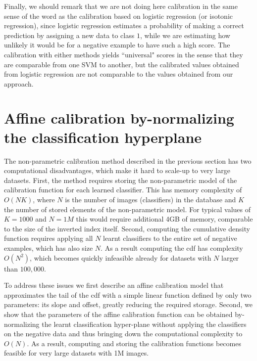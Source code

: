       Finally, we should remark that we are not doing here calibration in the same sense of the word as the calibration based on logistic regression (or isotonic regression), since logistic regression estimates a probability of making a correct prediction by assigning a new data to class $1$, while we are estimating how unlikely it would be for a negative example to have such a high score. The calibration with either methods yields ``universal" scores in the sense that they are comparable from one SVM to another, but the calibrated values obtained from logistic regression are not comparable to the values obtained from our approach.

\section{Affine calibration by-normalizing the classification hyperplane}
\label{sec:calibrationRenorm}
  
  The non-parametric calibration method described in the previous section has two computational disadvantages, which make it hard to scale-up to very large datasets. 
  First, the method requires storing the non-parametric model of the calibration function for each learned classifier. This has memory complexity 
  of $O(NK)$, where $N$ is the number of images (classifiers) in the database and $K$ the number of stored elements of the non-parametric model. For typical values of $K=1000$ and $N=1M$ this would require additional 4GB of memory, comparable to the size of the inverted index itself. Second, computing the cumulative density function requires applying all $N$ learnt classifiers to the entire set of negative examples, which has also size $N$. As a result computing the cdf has complexity $O(N^2)$, which becomes quickly infeasible already for datasets with $N$ larger than $100,000$. 
  
To address these issues we first describe an affine calibration model that approximates the tail of the cdf with a simple linear function defined by only two parameters: its slope and offset, greatly reducing the required storage.
Second, we show that the parameters of the affine calibration function can be obtained by-normalizing the learnt classification hyper-plane without applying the classifiers on the negative data and thus bringing down the computational complexity to $O(N)$.
As a result,  computing and storing the calibration functions becomes feasible for very large datasets with 1M images.

